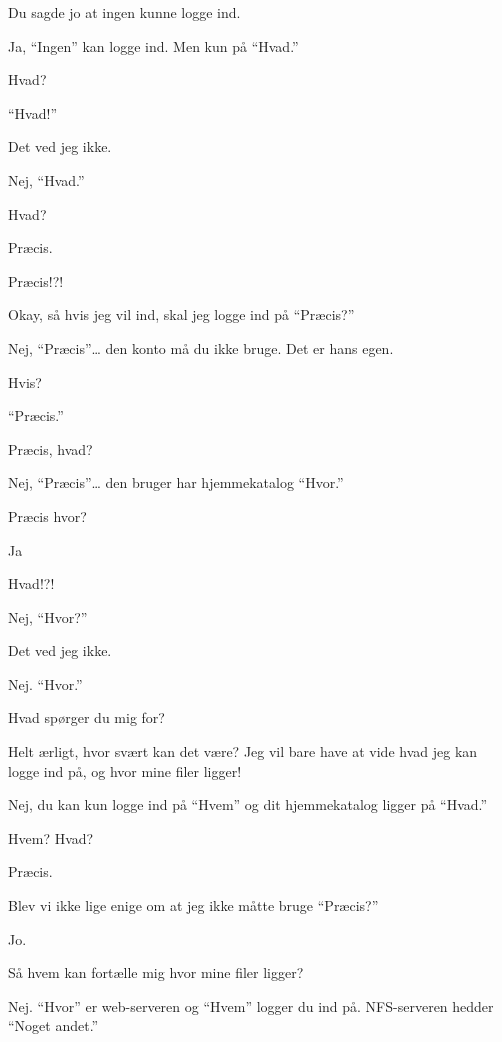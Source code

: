 \documentclass[10pt]{article}
\begin{document}
\begin{sketch}
 Du sagde jo at ingen kunne logge ind.

 Ja, ``Ingen'' kan logge ind. Men kun på ``Hvad.''

 Hvad?

 ``Hvad!''

 Det ved jeg ikke.

 Nej, ``Hvad.''

 Hvad?

 Præcis.

 Præcis!?!


 Okay, så hvis jeg vil ind, skal jeg logge ind på ``Præcis?''

 Nej, ``Præcis''\ldots{} den konto må du ikke bruge. 
           Det er hans egen.

 Hvis?

 ``Præcis.''

 Præcis, hvad?

 Nej, ``Præcis''\ldots{} den bruger har hjemmekatalog ``Hvor.''

 Præcis hvor?

 Ja

 Hvad!?!

 Nej, ``Hvor?''

 Det ved jeg ikke.

 Nej. ``Hvor.''

 Hvad spørger du mig for?


 Helt ærligt, hvor svært kan det være? Jeg vil bare have at vide 
          hvad jeg kan logge ind på, og hvor mine filer ligger!

 Nej, du kan kun logge ind på ``Hvem'' og dit hjemmekatalog ligger 
           på ``Hvad.''

 Hvem? Hvad?

 Præcis.

 Blev vi ikke lige enige om at jeg ikke måtte bruge ``Præcis?''

 Jo.

 Så hvem kan fortælle mig hvor mine filer ligger?

 Nej. ``Hvor'' er web-serveren og ``Hvem'' logger du ind på. NFS-serveren hedder ``Noget andet.''


\end{sketch}
\end{document}
